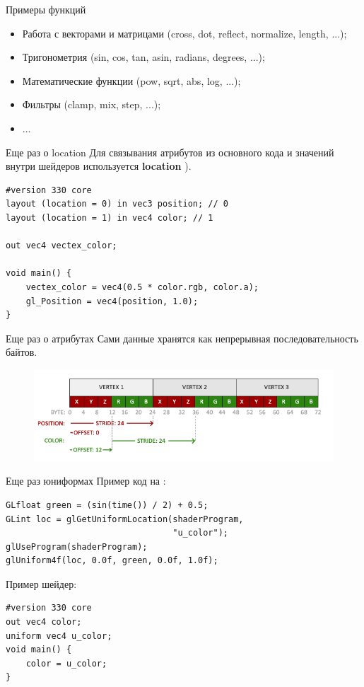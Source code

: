 \documentclass[aspectration=1610,t]{beamer}
\begin{document}
\begin{frame}[fragile]{Примеры функций}
    \begin{itemize}
        \item Работа с векторами и матрицами (cross, dot, reflect, normalize, length, ...);
        \item Тригонометрия (sin, cos, tan, asin, radians, degrees, ...);
        \item Математические функции (pow, sqrt, abs, log, ...);
        \item Фильтры (clamp, mix, step, ...);
        \item ...
    \end{itemize}
\end{frame}

\begin{frame}[fragile]{Еще раз о location}
    Для связывания атрибутов из основного кода и значений внутри шейдеров используется {\bf location }).
            {\small \begin{lstlisting}
#version 330 core
layout (location = 0) in vec3 position; // 0
layout (location = 1) in vec4 color; // 1

out vec4 vectex_color; 

void main() {
    vectex_color = vec4(0.5 * color.rgb, color.a);
    gl_Position = vec4(position, 1.0);
}
            \end{lstlisting}}
\end{frame}

\begin{frame}[fragile]{Еще раз о атрибутах}
    Сами данные хранятся как непрерывная последовательность байтов.
    \begin{figure}[htp]
        \centering
        \includegraphics[scale=0.40]{res/attr}
    \end{figure}
\end{frame}

\begin{frame}[fragile]{Еще раз юниформах}
    Пример код на \langcpp:
    {\small \begin{lstlisting}
GLfloat green = (sin(time()) / 2) + 0.5;
GLint loc = glGetUniformLocation(shaderProgram,
                                 "u_color");
glUseProgram(shaderProgram);
glUniform4f(loc, 0.0f, green, 0.0f, 1.0f);
\end{lstlisting}}
    
    Пример шейдер:
    {\small \begin{lstlisting}
#version 330 core
out vec4 color;
uniform vec4 u_color;
void main() {
    color = u_color;
}
    \end{lstlisting}}
\end{frame}
\end{document}
